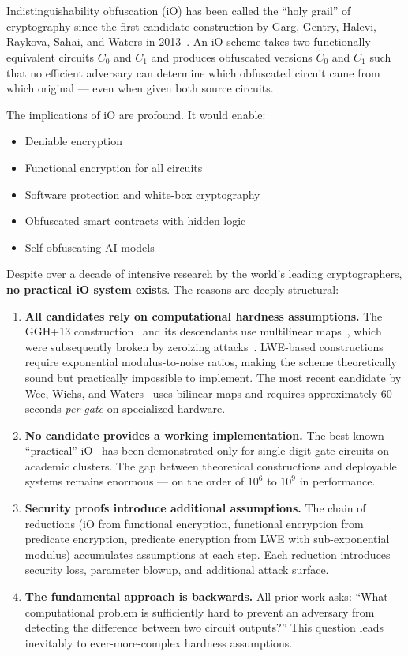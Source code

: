 \documentclass[11pt,a4paper]{article}
\begin{document}
Indistinguishability obfuscation (iO) has been called the ``holy grail'' of cryptography since the first candidate construction by Garg, Gentry, Halevi, Raykova, Sahai, and Waters in 2013~\cite{GGH13}. An iO scheme takes two functionally equivalent circuits $C_0$ and $C_1$ and produces obfuscated versions $\tilde{C}_0$ and $\tilde{C}_1$ such that no efficient adversary can determine which obfuscated circuit came from which original — even when given both source circuits.

The implications of iO are profound. It would enable:
\begin{itemize}[nosep]
    \item Deniable encryption~\cite{SW14}
    \item Functional encryption for all circuits~\cite{GGH13}
    \item Software protection and white-box cryptography
    \item Obfuscated smart contracts with hidden logic
    \item Self-obfuscating AI models
\end{itemize}

Despite over a decade of intensive research by the world's leading cryptographers, \textbf{no practical iO system exists}. The reasons are deeply structural:

\begin{enumerate}[leftmargin=*]
    \item \textbf{All candidates rely on computational hardness assumptions.} The GGH+13 construction~\cite{GGH13} and its descendants use multilinear maps~\cite{CLT13,GGH15}, which were subsequently broken by zeroizing attacks~\cite{CHL+15,CLLT16}. LWE-based constructions~\cite{JLS21,LT17} require exponential modulus-to-noise ratios, making the scheme theoretically sound but practically impossible to implement. The most recent candidate by Wee, Wichs, and Waters~\cite{WWW24} uses bilinear maps and requires approximately 60 seconds \emph{per gate} on specialized hardware.
    
    \item \textbf{No candidate provides a working implementation.} The best known ``practical'' iO~\cite{WWW24} has been demonstrated only for single-digit gate circuits on academic clusters. The gap between theoretical constructions and deployable systems remains enormous — on the order of $10^6$ to $10^9$ in performance.
    
    \item \textbf{Security proofs introduce additional assumptions.} The chain of reductions (iO from functional encryption, functional encryption from predicate encryption, predicate encryption from LWE with sub-exponential modulus) accumulates assumptions at each step. Each reduction introduces security loss, parameter blowup, and additional attack surface.
    
    \item \textbf{The fundamental approach is backwards.} All prior work asks: ``What computational problem is sufficiently hard to prevent an adversary from detecting the difference between two circuit outputs?'' This question leads inevitably to ever-more-complex hardness assumptions.
\end{enumerate}
\end{document}

